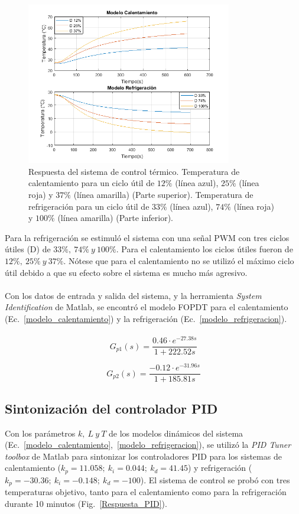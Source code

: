 \documentclass[runningheads]{llncs}
\begin{document}
\begin{figure}[ht!]
\includegraphics[width=0.8\textwidth]{Modelos.png}
\centering
\caption{Respuesta del sistema de control térmico. Temperatura de calentamiento para un ciclo útil de $12\%$ (línea azul), $25\%$ (línea roja) y $37\%$ (línea amarilla) (Parte superior). Temperatura de refrigeración para un ciclo útil de $33\%$ (línea azul), $74\%$ (línea roja) y $100\%$ (línea amarilla) (Parte inferior).} 
\label{model_sistema}
\end{figure}
Para la refrigeración se estimuló el sistema con una señal PWM con tres ciclos útiles (D) de $33\%,~74\%~y~100\%$. Para el calentamiento los ciclos útiles fueron de $12\%,~25\%~y~37\%$. Nótese que para el calentamiento no se utilizó el máximo ciclo útil debido a que su efecto sobre el sistema es mucho más agresivo.\\ \\
Con los datos de entrada y salida del sistema, y la herramienta \textit{System Identification} de Matlab, se encontró el modelo FOPDT para el calentamiento (Ec.~\ref{modelo_calentamiento}) y la refrigeración (Ec.~\ref{modelo_refrigeracion}).\\ \\

\begin{equation}
G_{p1}(s)=  \frac{0.46 \cdot e^{-27.38s}}{1+222.52s}
\label{modelo_calentamiento}
\end{equation}

\begin{equation}
G_{p2}(s)=  \frac{-0.12 \cdot e^{-31.96s}}{1+185.81s}
\label{modelo_refrigeracion}
\end{equation}
\subsection{Sintonización del controlador PID}
Con los parámetros $k,~L~y~T$ de los modelos dinámicos del sistema (Ec.~\ref{modelo_calentamiento},~\ref{modelo_refrigeracion}), se utilizó la \textit{PID Tuner toolbox} de Matlab para sintonizar los controladores PID para los sistemas de calentamiento ($k_{p}=11.058;~k_{i}=0.044;~k_{d}=41.45$) y refrigeración ($k_{p}=-30.36;~k_{i}=-0.148;~k_{d}=-100$). El sistema de control se probó con tres temperaturas objetivo, tanto para el calentamiento como para la refrigeración durante 10 minutos (Fig.~\ref{Respuesta_PID}).
\end{document}
